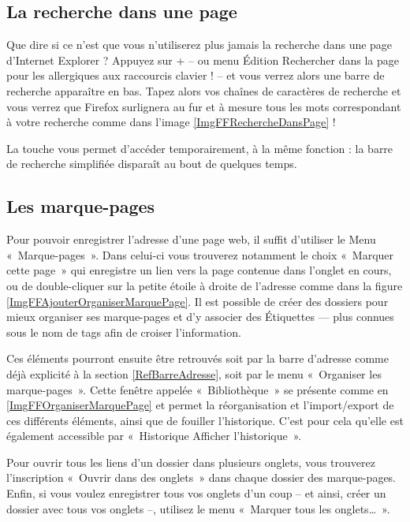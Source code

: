 \subsection{La recherche dans une page}
\label{RefRechercheFF}
Que dire si ce n'est que vous n'utiliserez plus jamais la recherche dans une page d'Internet Explorer ? Appuyez sur  +  -- ou menu Édition \FlecheDroite Rechercher dans la page pour les allergiques aux raccourcis clavier ! -- et vous verrez alors une barre de recherche apparaître en bas. Tapez alors vos chaînes de caractères de recherche et vous verrez que Firefox surlignera au fur et à mesure tous les mots correspondant à votre recherche comme dans l'image \ref{ImgFFRechercheDansPage} !
\begin{nota}
La touche \Touche{/} vous permet d'accéder temporairement, à la même fonction : la barre de recherche simplifiée disparaît au bout de quelques temps.
\end{nota}
\subsection{Les marque-pages}
\label{RefMarquePage}
Pour pouvoir enregistrer l'adresse d'une page web, il suffit d'utiliser le Menu «~Marque-pages~». Dans celui-ci vous trouverez notamment le choix «~Marquer cette page~» qui enregistre un lien vers la page contenue dans l'onglet en cours, ou de double-cliquer sur la petite étoile à droite de l'adresse comme dans la figure \ref{ImgFFAjouterOrganiserMarquePage}. Il est possible de créer des dossiers pour mieux organiser ses marque-pages et d'y associer des Étiquettes --- plus connues sous le nom de tags afin de croiser l'information.\par
{}
Ces éléments pourront ensuite être retrouvés soit par la barre d'adresse comme déjà explicité à la section \ref{RefBarreAdresse}, soit par le menu «~Organiser les marque-pages~». Cette fenêtre appelée «~Bibliothèque~» se présente comme en \ref{ImgFFOrganiserMarquePage} et permet la réorganisation et l'import/export de ces différents éléments, ainsi que de fouiller l'historique. C'est pour cela qu'elle est également accessible par «~Historique \FlecheDroite Afficher l'historique~».\par
{}
Pour ouvrir tous les liens d'un dossier dans plusieurs onglets, vous trouverez l'inscription «~Ouvrir dans des onglets~» dans chaque dossier des marque-pages.\\
Enfin, si vous voulez enregistrer tous vos onglets d'un coup -- et ainsi, créer un dossier avec tous vos onglets --, utilisez le menu «~Marquer tous les onglets\ldots{}~».
